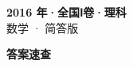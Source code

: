 \documentclass[zihao=-4, a4paper]{ctexart}
\begin{document}
\begin{center}
  {\Large\bfseries 2016 年·全国Ⅰ卷·理科}\\[4pt]
  {\large 数学 · 简答版}
\end{center}
\medskip
{}

\clearpage
{}
\begin{center}{\Large\bfseries 答案速查}\end{center}
\medskip

\end{document}
